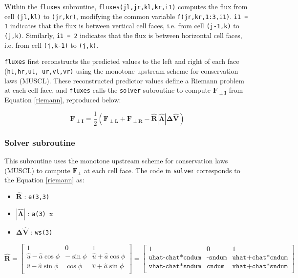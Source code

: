 \documentclass{article}
\newcommand{\code}[1]{\texttt{#1}}
\begin{document}
Within the \code{fluxes} subroutine, \code{fluxes(jl,jr,kl,kr,i1)} computes the flux from cell \code{(jl,kl)} to \code{(jr,kr)}, modifying the common variable \code{f(jr,kr,1:3,i1)}. 
\code{i1 = 1} indicates that the flux is between vertical cell faces, i.e. from cell \code{(j-1,k)} to \code{(j,k)}.
Similarly, \code{i1 = 2} indicates that the flux is between horizontal cell faces, i.e. from cell \code{(j,k-1)} to \code{(j,k)}.

 
\code{fluxes}  first reconstructs the predicted values to the left and right of each face (\code{hl,hr,ul, ur,vl,vr)} using the monotone upstream scheme for conservation laws (MUSCL).  These reconstructed predictor values define a Riemann problem at each cell face, and \code{fluxes} calls the \code{solver} subroutine to compute $\mathbf{F_{\perp I}}$ from Equation \ref{riemann}, reproduced below:

\begin{equation*}
\mathbf{F_{\perp I}} =
	 \frac{1}{2} (\mathbf{F_{\perp L}} + \mathbf{F_{\perp R}} - \mathbf{\hat{R} |\hat{\Lambda}| \Delta \hat V  })
\end{equation*}


\subsubsection*{Solver subroutine}

This subroutine uses the monotone upstream scheme for conservation laws (MUSCL) to compute $\mathbf{F_\perp}$ at each cell face.  The code in \code{solver} corresponds to the Equation \ref{riemann} as: 

 \begin{itemize}
 	\item $\mathbf{\hat{R}}$ : \code{e(3,3)}
 	\item $\mathbf{|\hat{\Lambda}|}$ : \code{a(3) }x
 	\item $\mathbf{ \Delta \hat V  }  $ : \code{ws(3)} 
 \end{itemize}
 
 \[ \mathbf{\hat{R}} = 
\begin{bmatrix}
    1 &  0  & 1  \\
    \hat{u} -\hat{a} \cos{\phi} &   -\sin{\phi} & \hat{u} +\hat{a} \cos{\phi}   \\
    \hat{v} -\hat{a} \sin{\phi} &   \cos{\phi} & \hat{v} +\hat{a} \sin{\phi}    \\
\end{bmatrix} = 
\begin{bmatrix}
    1 &  0  & 1  \\
    \code{uhat-chat*cndum} &    \code{-sndum} &  \code{uhat+chat*cndum} \\
    \code{vhat-chat*sndum} &    \code{cndum} &  \code{vhat+chat*sndum} \\
\end{bmatrix}
\]
\end{document}
